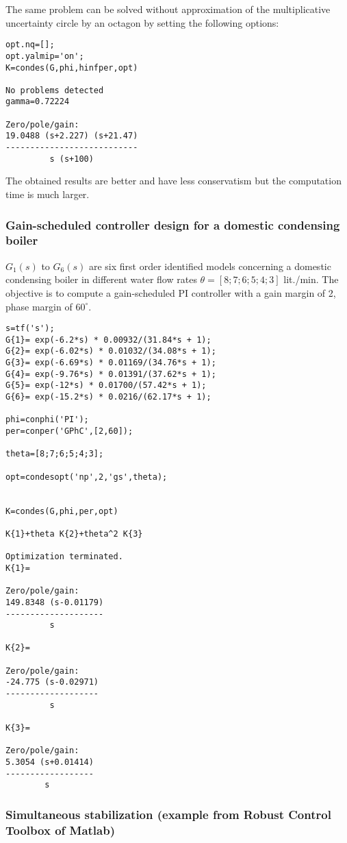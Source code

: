 \documentclass [12pt , a4paper] {report}
\begin{document}
The same problem can be solved without approximation of the multiplicative uncertainty circle by an octagon by setting the following options:
\begin{lstlisting}
opt.nq=[];
opt.yalmip='on';
K=condes(G,phi,hinfper,opt)

No problems detected 
gamma=0.72224
 
Zero/pole/gain:
19.0488 (s+2.227) (s+21.47)
---------------------------
         s (s+100)
\end{lstlisting}

The obtained results are better and have less conservatism but the computation time is much larger.

\subsubsection{Gain-scheduled controller design for a domestic condensing boiler}
$G_1(s)$ to $G_6(s)$ are six first order identified models concerning a domestic condensing boiler in
 different water flow rates $\theta=[8;7;6;5;4;3]$ lit./min.
 The objective is to compute a gain-scheduled PI controller with a gain margin of 2, phase margin of $60^{\circ}$.
 
 \begin{lstlisting}
s=tf('s');
G{1}= exp(-6.2*s) * 0.00932/(31.84*s + 1);
G{2}= exp(-6.02*s) * 0.01032/(34.08*s + 1);
G{3}= exp(-6.69*s) * 0.01169/(34.76*s + 1);
G{4}= exp(-9.76*s) * 0.01391/(37.62*s + 1);
G{5}= exp(-12*s) * 0.01700/(57.42*s + 1);
G{6}= exp(-15.2*s) * 0.0216/(62.17*s + 1);
              
phi=conphi('PI');
per=conper('GPhC',[2,60]);

theta=[8;7;6;5;4;3];

opt=condesopt('np',2,'gs',theta);


K=condes(G,phi,per,opt)

K{1}+theta K{2}+theta^2 K{3} 

Optimization terminated.
K{1}=
 
Zero/pole/gain:
149.8348 (s-0.01179)
--------------------
         s
 
K{2}=
 
Zero/pole/gain:
-24.775 (s-0.02971)
-------------------
         s
 
K{3}=
 
Zero/pole/gain:
5.3054 (s+0.01414)
------------------
        s
\end{lstlisting}

\subsubsection{Simultaneous stabilization (example from Robust Control Toolbox of Matlab)}
\end{document}
